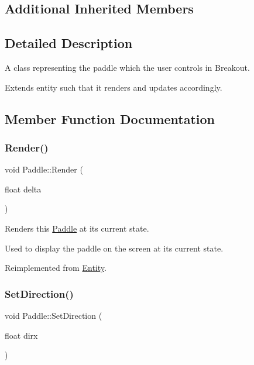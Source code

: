 \subsection*{Additional Inherited Members}


\subsection{Detailed Description}
A class representing the paddle which the user controls in Breakout. 

Extends entity such that it renders and updates accordingly. 

\subsection{Member Function Documentation}
\mbox{\label{classPaddle_a166255dfac354af75059ed4a72e1a0ee}} 
\subsubsection{\texorpdfstring{Render()}{Render()}}
{\footnotesize\ttfamily void Paddle\+::\+Render (\begin{DoxyParamCaption}\item[{float}]{delta }\end{DoxyParamCaption})\hspace{0.3cm}{\ttfamily [virtual]}}



Renders this \hyperlink{classPaddle}{Paddle} at its current state. 

Used to display the paddle on the screen at its current state. 

Reimplemented from \hyperlink{classEntity_a48b58f16934376de583771ddabcf5bdb}{Entity}.

\mbox{\label{classPaddle_ac168c216a591b78851142d2160cebf9b}} 
\subsubsection{\texorpdfstring{Set\+Direction()}{SetDirection()}}
{\footnotesize\ttfamily void Paddle\+::\+Set\+Direction (\begin{DoxyParamCaption}\item[{float}]{dirx }\end{DoxyParamCaption})}



